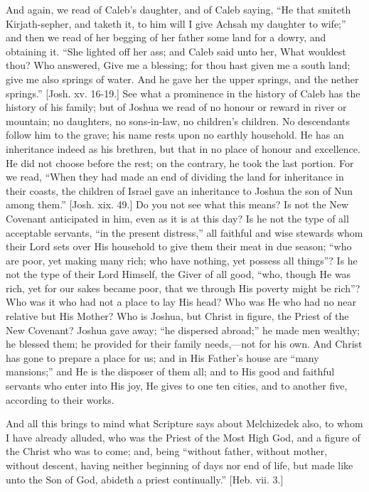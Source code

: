 And again, we read of Caleb's daughter, and of Caleb saying,
``He that smiteth Kirjath-sepher, and taketh it, to him will I
give Achsah my daughter to wife;'' and then we read of her begging
of her father some land for a dowry, and obtaining it. ``She
lighted off her ass; and Caleb said unto her, What wouldest thou? Who
answered, Give me a blessing; for thou hast given me a south land;
give me also springs of water. And he gave her the upper springs, and
the nether springs.'' [Josh. xv. 16-19.] See what a prominence in
the history of Caleb has the history of his family; but of Joshua we
read of no honour or reward in river or mountain; no daughters, no
sons-in-law, no children's children. No descendants follow him to the
grave; his name rests upon no earthly household. He has an inheritance
indeed as his brethren, but that in no place of honour and excellence.
He did not choose before the rest; on the contrary, he took the last
portion. For we read, ``When they had made an end of dividing the
land for inheritance in their coasts, the children of Israel gave an
inheritance to Joshua the son of Nun among them.'' [Josh. xix.
49.] Do you not see what this means? Is not the New Covenant
anticipated in him, even as it is at this day? Is he not the type of
all acceptable servants, ``in the present distress,'' all
faithful and wise stewards whom their Lord sets over His household to
give them their meat in due season; ``who are poor, yet making
many rich; who have nothing, yet possess all things''? Is he not
the type of their Lord Himself, the Giver of all good, ``who,
though He was rich, yet for our sakes became poor, that we through His
poverty might be rich''? Who was it who had not a place to lay His
head? Who was He who had no near relative but His Mother? Who is
Joshua, but Christ in figure, the Priest of the New Covenant? Joshua
gave away; ``he dispersed abroad;'' he made men wealthy; he
blessed them; he provided for their family needs,—not for his own.
And Christ has gone to prepare a place for us; and in His Father's
house are ``many mansions;'' and He is the disposer of them
all; and to His good and faithful servants who enter into His joy, He
gives to one ten cities, and to another five, according to their
works.

And all this brings to mind what Scripture says about Melchizedek
also, to whom I have already alluded, who was the Priest of the Most
High God, and a figure of the Christ who was to come; and, being
``without father, without mother, without descent, having neither
beginning of days nor end of life, but made like unto the Son of God,
abideth a priest continually.'' [Heb. vii. 3.]


